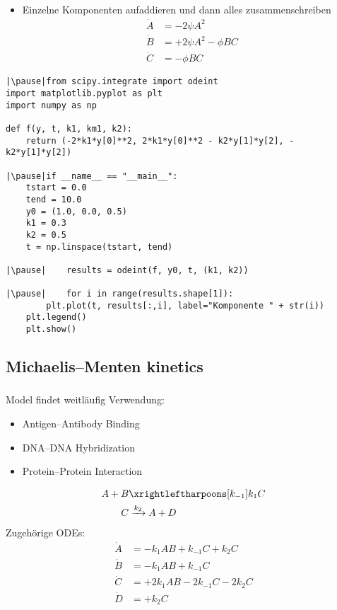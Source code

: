 \begin{frame}[fragile]
    \begin{itemize}
        \item[ ] Einzelne Komponenten aufaddieren und dann alles zusammenschreiben
        \pause
        \begin{align}
            \dot{A} &= -2\psi A^2\\
            \dot{B} &= +2\psi A^2 -\phi BC\\
            \dot{C} &= -\phi BC
        \end{align}
    \end{itemize}
\end{frame}


\begin{frame}[fragile]
    \begin{verbatim}
|\pause|from scipy.integrate import odeint
import matplotlib.pyplot as plt
import numpy as np

def f(y, t, k1, km1, k2):
    return (-2*k1*y[0]**2, 2*k1*y[0]**2 - k2*y[1]*y[2], - k2*y[1]*y[2])

|\pause|if __name__ == "__main__":
    tstart = 0.0
    tend = 10.0
    y0 = (1.0, 0.0, 0.5)
    k1 = 0.3
    k2 = 0.5
    t = np.linspace(tstart, tend)
    
|\pause|    results = odeint(f, y0, t, (k1, k2))

|\pause|    for i in range(results.shape[1]):
        plt.plot(t, results[:,i], label="Komponente " + str(i))
    plt.legend()
    plt.show()
    \end{verbatim}
\end{frame}


\subsection{Michaelis–Menten kinetics}
\begin{frame}
    \frametitle{\insertsubsection}
    Model findet weitläufig Verwendung:
    \begin{itemize}[<+->]
        \item Antigen–Antibody Binding
        \item DNA–DNA Hybridization
        \item Protein–Protein Interaction
    \end{itemize}
    \begin{align}
        A+B&\xrightleftharpoons[k_{-1}]{k_1}C\\
        C&\xrightarrow{k_2}A+D
    \end{align}
    Zugehörige ODEs:
    \begin{align}
        \dot{A} &= -k_1AB + k_{-1}C + k_2C\\
        \dot{B} &= -k_1AB + k_{-1}C\\
        \dot{C} &= +2k_1AB - 2k_{-1}C - 2k_2C\\
        \dot{D} &= +k_2C
    \end{align}
\end{frame}